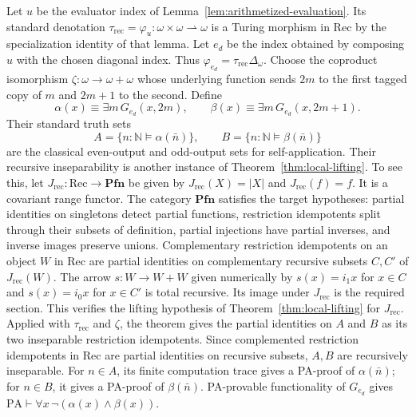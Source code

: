 \documentclass[11pt]{article}
\newcommand{\N}{\mathbb N}
\newcommand{\PA}{\mathrm{PA}}
\newcommand{\Pfn}{\mathbf{Pfn}}
\begin{document}
Let $u$ be the evaluator index of Lemma~\ref{lem:arithmetized-evaluation}.
Its standard denotation
$\tau_{\mathrm{rec}}=\varphi_u:\omega\times\omega\rightharpoonup\omega$
is a Turing morphism in $\mathrm{Rec}$ by the specialization identity
of that lemma. Let $e_d$ be the index obtained by composing $u$
with the chosen diagonal index. Thus
$\varphi_{e_d}=\tau_{\mathrm{rec}}\Delta_\omega$.
Choose the coproduct isomorphism $\zeta:\omega\to\omega+\omega$
whose underlying function sends $2m$ to the first tagged copy of $m$
and $2m+1$ to the second. Define
\[
 \alpha(x)\equiv\exists m\,G_{e_d}(x,2m),\qquad
 \beta(x)\equiv\exists m\,G_{e_d}(x,2m+1).
\]
Their standard truth sets
\[
 A=\{n:\N\models\alpha(\bar n)\},\qquad
 B=\{n:\N\models\beta(\bar n)\}
\]
are the classical even-output and odd-output sets for self-application.
Their recursive inseparability is another instance of
Theorem~\ref{thm:local-lifting}. To see this, let
$J_{\mathrm{rec}}:\mathrm{Rec}\to\Pfn$ be given by
$J_{\mathrm{rec}}(X)=|X|$ and $J_{\mathrm{rec}}(f)=f$.
It is a covariant range functor. The category $\Pfn$ satisfies
the target hypotheses: partial identities on singletons detect partial
functions, restriction idempotents split through their subsets of
definition, partial injections have partial inverses, and inverse images
preserve unions. Complementary restriction idempotents on an object $W$
in $\mathrm{Rec}$ are partial identities on complementary recursive
subsets $C,C'$ of $J_{\mathrm{rec}}(W)$. The arrow $s:W\to W+W$
given numerically by $s(x)=i_1x$ for $x\in C$ and $s(x)=i_0x$
for $x\in C'$ is total recursive. Its image under $J_{\mathrm{rec}}$ is the
required section. This verifies the lifting hypothesis of
Theorem~\ref{thm:local-lifting} for $J_{\mathrm{rec}}$.
Applied with $\tau_{\mathrm{rec}}$ and $\zeta$, the theorem gives
the partial identities on $A$ and $B$ as its two inseparable
restriction idempotents. Since complemented restriction idempotents
in $\mathrm{Rec}$ are partial identities on recursive subsets,
$A,B$ are recursively inseparable.
For $n\in A$, its finite computation trace gives a PA-proof of
$\alpha(\bar n)$; for $n\in B$, it gives a PA-proof of
$\beta(\bar n)$. PA-provable functionality of $G_{e_d}$ gives
$\PA\vdash\forall x\,\neg(\alpha(x)\land\beta(x))$.
\end{document}
